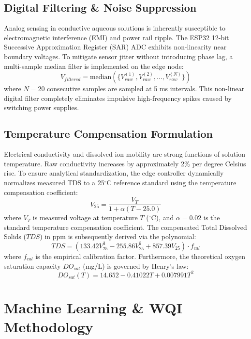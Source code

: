 \documentclass[conference]{IEEEtran}
\begin{document}
\subsection{Digital Filtering \& Noise Suppression}
Analog sensing in conductive aqueous solutions is inherently susceptible to electromagnetic interference (EMI) and power rail ripple. The ESP32 12-bit Successive Approximation Register (SAR) ADC exhibits non-linearity near boundary voltages. To mitigate sensor jitter without introducing phase lag, a multi-sample median filter is implemented on the edge node:
\begin{equation}
V_{filtered} = \text{median}\left(\{V_{raw}^{(1)}, V_{raw}^{(2)}, \dots, V_{raw}^{(N)}\}\right)
\label{eq:median}
\end{equation}
where $N = 20$ consecutive samples are sampled at 5 ms intervals. This non-linear digital filter completely eliminates impulsive high-frequency spikes caused by switching power supplies.

\subsection{Temperature Compensation Formulation}
Electrical conductivity and dissolved ion mobility are strong functions of solution temperature. Raw conductivity increases by approximately 2\% per degree Celsius rise. To ensure analytical standardization, the edge controller dynamically normalizes measured TDS to a 25$^\circ$C reference standard using the temperature compensation coefficient:
\begin{equation}
V_{25} = \frac{V_T}{1 + \alpha (T - 25.0)}
\label{eq:temp_comp}
\end{equation}
where $V_T$ is measured voltage at temperature $T$ ($^\circ$C), and $\alpha = 0.02$ is the standard temperature compensation coefficient. The compensated Total Dissolved Solids ($TDS$) in ppm is subsequently derived via the polynomial:
\begin{equation}
TDS = \left(133.42 V_{25}^3 - 255.86 V_{25}^2 + 857.39 V_{25}\right) \cdot f_{cal}
\label{eq:tds_poly}
\end{equation}
where $f_{cal}$ is the empirical calibration factor. Furthermore, the theoretical oxygen saturation capacity $DO_{sat}$ (mg/L) is governed by Henry's law:
\begin{equation}
DO_{sat}(T) = 14.652 - 0.41022 T + 0.007991 T^2
\label{eq:do_sat}
\end{equation}

\section{Machine Learning \& WQI Methodology}
\end{document}
